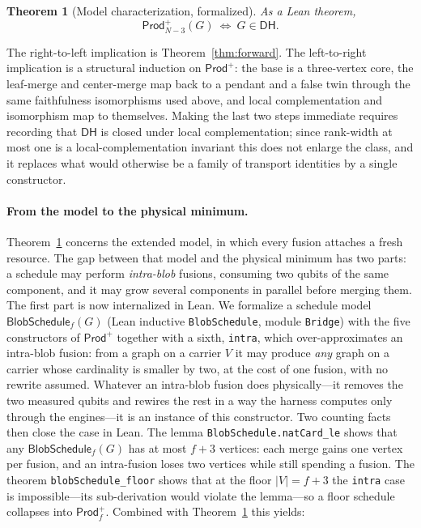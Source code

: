 \documentclass[11pt]{article}
\newtheorem{theorem}{Theorem}
\theoremstyle{definition}
\theoremstyle{remark}
\newcommand{\Prod}{\mathsf{Prod}}
\newcommand{\N}{N}
\newcommand{\code}[1]{\texttt{#1}}
\begin{document}
\begin{theorem}[Model characterization, formalized]\label{thm:reverse}
As a Lean theorem,
\[
  \Prod^{+}_{\N-3}(G)\ \Longleftrightarrow\ G\in\mathsf{DH}.
\]
\end{theorem}

The right-to-left implication is Theorem~\ref{thm:forward}. The left-to-right implication is a
structural induction on $\Prod^{+}$: the base is a three-vertex core, the leaf-merge and
center-merge map back to a pendant and a false twin through the same faithfulness isomorphisms
used above, and local complementation and isomorphism map to themselves. Making the last two steps
immediate requires recording that $\mathsf{DH}$ is closed under local complementation; since
rank-width at most one is a local-complementation invariant this does not enlarge the class, and
it replaces what would otherwise be a family of transport identities by a single constructor.

\paragraph{From the model to the physical minimum.} Theorem~\ref{thm:reverse} concerns the extended
model, in which every fusion attaches a fresh resource. The gap between that model and the physical
minimum has two parts: a schedule may perform \emph{intra-blob} fusions, consuming two qubits of
the same component, and it may grow several components in parallel before merging them. The first
part is now internalized in Lean. We formalize a schedule model $\mathsf{BlobSchedule}_f(G)$ (Lean
inductive \code{BlobSchedule}, module \code{Bridge}) with the five constructors of $\Prod^{+}$
together with a sixth, \code{intra}, which over-approximates an intra-blob fusion: from a graph on
a carrier $V$ it may produce \emph{any} graph on a carrier whose cardinality is smaller by two, at
the cost of one fusion, with no rewrite assumed. Whatever an intra-blob fusion does physically---it
removes the two measured qubits and rewires the rest in a way the harness computes only through the
engines---it is an instance of this constructor. Two counting facts then close the case in Lean.
The lemma \code{BlobSchedule.natCard\_le} shows that any $\mathsf{BlobSchedule}_f(G)$ has at most
$f+3$ vertices: each merge gains one vertex per fusion, and an intra-fusion loses two vertices
while still spending a fusion. The theorem \code{blobSchedule\_floor} shows that at the floor
$|V|=f+3$ the \code{intra} case is impossible---its sub-derivation would violate the lemma---so a
floor schedule collapses into $\Prod^{+}_f$. Combined with Theorem~\ref{thm:reverse} this yields:
\end{document}
